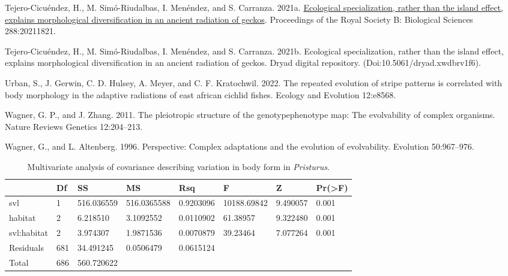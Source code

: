 \documentclass[
  11pt,
]{article}
\newlength{\cslhangindent}
\newlength{\cslentryspacingunit} %
\newenvironment{CSLReferences}[2] %
 {%
  \setlength{\parindent}{0pt}
  \ifodd #1
  \let\oldpar\par
  \def\par{\hangindent=\cslhangindent\oldpar}
  \fi
  \setlength{\parskip}{#2\cslentryspacingunit}
 }%
 {}
\begin{document}
\begin{CSLReferences}{1}{0}
\leavevmode{}%
Tejero-Cicuéndez, H., M. Simó-Riudalbas, I. Menéndez, and S. Carranza.
2021a. \href{https://doi.org/10.1098/rspb.2021.1821}{Ecological
specialization, rather than the island effect, explains morphological
diversification in an ancient radiation of geckos}. Proceedings of the
Royal Society B: Biological Sciences 288:20211821.

\leavevmode{}%
Tejero-Cicuéndez, H., M. Simó-Riudalbas, I. Menéndez, and S. Carranza.
2021b. Ecological specialization, rather than the island effect,
explains morphological diversification in an ancient radiation of
geckos. Dryad digital repository. (Doi:10.5061/dryad.xwdbrv1f6).

\leavevmode{}%
Urban, S., J. Gerwin, C. D. Hulsey, A. Meyer, and C. F. Kratochwil.
2022. The repeated evolution of stripe patterns is correlated with body
morphology in the adaptive radiations of east african cichlid fishes.
Ecology and Evolution 12:e8568.

\leavevmode{}%
Wagner, G. P., and J. Zhang. 2011. The pleiotropic structure of the
genotype{\textendash}phenotype map: The evolvability of complex
organisms. Nature Reviews Genetics 12:204--213.

\leavevmode{}%
Wagner, G., and L. Altenberg. 1996. Perspective: Complex adaptations and
the evolution of evolvability. Evolution 50:967--976.

\end{CSLReferences}

\newpage

\begin{table}[H]

\caption{\label{tab:unnamed-chunk-1}Multivariate analysis of covariance describing variation in body form in \textit{Pristurus}.}
\centering
\begin{tabular}[t]{llllllll}
\toprule
  & Df & SS & MS & Rsq & F & Z & Pr(>F)\\
\midrule
svl & 1 & 516.036559 & 516.0365588 & 0.9203096 & 10188.69842 & 9.490057 & 0.001\\
habitat & 2 & 6.218510 & 3.1092552 & 0.0110902 & 61.38957 & 9.322480 & 0.001\\
svl:habitat & 2 & 3.974307 & 1.9871536 & 0.0070879 & 39.23464 & 7.077264 & 0.001\\
Residuals & 681 & 34.491245 & 0.0506479 & 0.0615124 &  &  & \\
Total & 686 & 560.720622 &  &  &  &  & \\
\bottomrule
\end{tabular}
\end{table}
\end{document}

